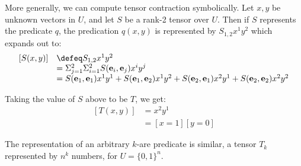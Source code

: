More generally, we can compute tensor contraction symbolically. Let \(x,y\) be  unknown vectors in \(U\), and let \(S\) be a rank-2 tensor over \(U\). Then if \(S\) represents the predicate \(q\), the predication \(q(x,y)\) is represented by \(S_{1,2}x^1 y^2\) which expands out to:
\[\begin{array}{ll}
  [S(x,y)]&\defeq  S_{1,2}x^1 y^2\\
  & = \Sigma_{j=1}^2 \Sigma_{i=1}^2 S({\bf e}_i,{\bf e}_j)x^iy^j \\
  & =S({\bf e}_1,{\bf e}_1)x^1y^1 + S({\bf e}_1,{\bf e}_2)x^1y^2 +
      S({\bf e}_2,{\bf e}_1)x^2y^1 + S({\bf e}_2,{\bf e}_2)x^2y^2 \\
  \end{array}
\]

\begin{example}
  Taking the value of \(S\) above to be \(T\), we get:
  \[\begin{array}{ll}    
      [T(x,y)] & = x^2y^1\\
      & = [x=1][y=0]
  \end{array}
  \]
\end{example}

The representation of an arbitrary $k$-are predicate is similar, a tensor \(T_k\) represented by \(n^k\) numbers, for \(U=\{0,1\}^n\). 
